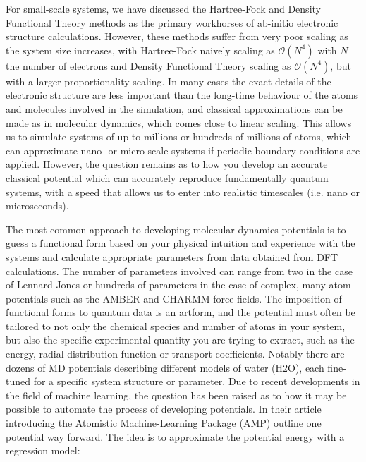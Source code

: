 For small-scale systems, we have discussed the Hartree-Fock
and Density Functional Theory methods as the primary workhorses of ab-initio
electronic structure calculations. However, these methods suffer
from very poor scaling as the system size increases, with Hartree-Fock
naively scaling as $\mathcal{O}(N^4)$ with $N$ the number of electrons
and Density Functional Theory scaling as $\mathcal{O}(N^4)$,
but with a larger proportionality scaling.
In many cases the exact details of the electronic structure
are less important than the long-time behaviour of the atoms
and molecules involved in the simulation, and classical approximations
can be made as in molecular dynamics, which comes close
to linear scaling. This allows us to simulate systems
of up to millions or hundreds of millions of atoms,
which can approximate nano- or micro-scale systems if
periodic boundary conditions are applied.
However, the question remains as to how you develop an
accurate classical potential which can accurately reproduce
fundamentally quantum systems, with a speed that allows
us to enter into realistic timescales (i.e. nano or microseconds).
\par
The most common approach to developing molecular dynamics potentials
is to guess a functional form based on your physical intuition
and experience with the systems and calculate appropriate parameters
from data obtained from DFT calculations.
The number of parameters involved can range from two in the case
of Lennard-Jones or hundreds of parameters in the case
of complex, many-atom potentials such as the AMBER and CHARMM
force fields. The imposition of functional forms to quantum data
is an artform, and the potential must often be tailored to not
only the chemical species and number of atoms in your system,
but also the specific experimental quantity you are trying to extract,
such as the energy, radial distribution function or transport
coefficients. Notably there are dozens of MD potentials
describing different models of water (H2O), each fine-tuned
for a specific system structure or parameter.
\newline
\newline
Due to recent developments in the field of machine learning,
the question has been raised as to how it may be possible to
automate the process of developing potentials.
In their article introducing the Atomistic Machine-Learning Package
(AMP) \parencite[Khorshidi, Alireza and Peterson, Andrew A.]
{khorshidi2016amp} outline one potential way forward.
The idea is to approximate the potential energy
with a regression model:


